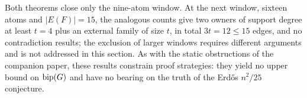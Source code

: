 \begin{remark}[Scope]\label{rem:t3-scope}
Both theorems close only the nine-atom window. At the next window,
sixteen atoms and \(|E(F)|=15\), the analogous counts give two owners
of support degree at least \(t=4\) plus an external family of size
\(t\), in total \(3t=12\le15\) edges, and no contradiction results;
the exclusion of larger windows requires different arguments and is
not addressed in this section. As with the static obstructions of the
companion paper, these results constrain proof strategies: they yield
no upper bound on \(\operatorname{bip}(G)\) and have no bearing on the truth of the
Erd\H{o}s \(n^2/25\) conjecture.
\end{remark}
